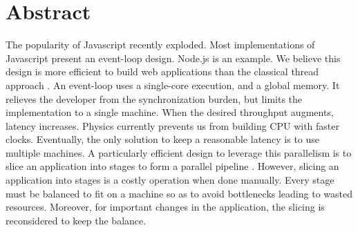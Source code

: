 \section*{Abstract}








The popularity of Javascript recently exploded.
Most implementations of Javascript present an event-loop design.
Node.js is an example.
We believe this design is more efficient to build web applications than the classical thread approach \cite{Lei2014}.
An event-loop uses a single-core execution, and a global memory.
It relieves the developer from the synchronization burden, but limits the implementation to a single machine.
When the desired throughput augments, latency increases.
Physics currently prevents us from building CPU with faster clocks.
Eventually, the only solution to keep a reasonable latency is to use multiple machines.
A particularly efficient design to leverage this parallelism is to slice an application into stages to form a parallel pipeline \cite{Welsh2000}.
However, slicing an application into stages is a costly operation when done manually.
Every stage must be balanced to fit on a machine so as to avoid bottlenecks leading to wasted resources.
Moreover, for important changes in the application, the slicing is reconsidered to keep the balance.

